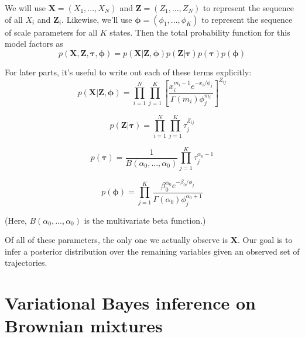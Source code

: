 \documentclass{article}
\let\vec\boldsymbol
\begin{document}
We will use $\vec{X} = \left( X_{1}, ..., X_{N} \right)$ and
$\vec{Z} = \left( Z_{1}, ..., Z_{N} \right)$ to represent the sequence of
all $X_{i}$ and $\vec{Z}_{i}$.
Likewise, we'll use $\boldsymbol{\phi} = (\phi_{1}, ..., \phi_{K})$ to represent the sequence of scale parameters for all $K$ states.
Then the total probability function for this model factors as
\[
    p \left( \vec{X}, \vec{Z}, \boldsymbol{\tau}, \boldsymbol{\phi} \right) = p \left( \vec{X} | \vec{Z}, \boldsymbol{\phi} \right) p \left( \vec{Z} | \boldsymbol{\tau} \right) p \left( \boldsymbol{\tau} \right) p \left( \boldsymbol{\phi} \right)
\]

For later parts, it's useful to write out each of these terms explicitly:
\begin{equation}\label{eq:eqA}
    p \left( \vec{X} | \vec{Z}, \boldsymbol{\phi} \right) = \prod\limits_{i=1}^{N} \prod\limits_{j=1}^{K} \left[
        \frac{ x_{i}^{m_{i}-1} e^{-x_{i} / \phi_{j}}}{\Gamma (m_{i}) \phi_{j}^{m_{i}}}
    \right]^{Z_{ij}}
\end{equation}

\begin{equation}\label{eq:eqB}
    p \left( \vec{Z} | \boldsymbol{\tau} \right) = \prod\limits_{i=1}^{N} \prod\limits_{j=1}^{K} \tau_{j}^{Z_{ij}}
\end{equation}

\begin{equation}\label{eq:eqC}
    p \left( \boldsymbol{\tau} \right) = \frac{1}{B(\alpha_{0}, ..., \alpha_{0})} \prod\limits_{j=1}^{K} \tau_{j}^{\alpha_{0} - 1}
\end{equation}

\begin{equation}\label{eq:eqD}
    p \left( \boldsymbol{\phi} \right) = \prod\limits_{j=1}^{K} \frac{\beta_{0}^{\alpha_{0}} e^{-\beta_{0} / \phi_{j}}}{\Gamma (\alpha_{0}) \phi_{j}^{\alpha_{0} + 1}}
\end{equation}

(Here, $B(\alpha_{0}, ..., \alpha_{0})$ is the multivariate beta function.) \newline

Of all of these parameters, the only one we actually observe is $\vec{X}$.
Our goal is to infer a posterior distribution over the remaining variables
given an observed set of trajectories.

\section{Variational Bayes inference on Brownian mixtures}
\end{document}
